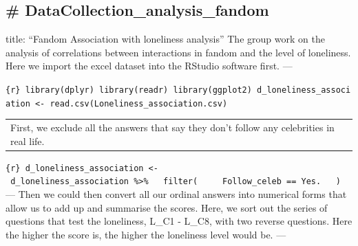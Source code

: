 \documentclass[
]{article}
\author{}
\date{\vspace{-2.5em}}
\begin{document}
\subsection{\#
DataCollection\_analysis\_fandom}\label{datacollection_analysis_fandom}

title: ``Fandom Association with loneliness analysis'' The group work on
the analysis of correlations between interactions in fandom and the
level of loneliness. Here we import the excel dataset into the RStudio
software first. ---

\texttt{\{r\}\ library(dplyr)\ library(readr)\ library(ggplot2)\ d\_loneliness\_association\ \textless{}-\ read.csv(\textquotesingle{}Loneliness\_association.csv\textquotesingle{})}

\begin{longtable}[]{@{}l@{}}
\toprule\noalign{}
\endhead
\bottomrule\noalign{}
\endlastfoot
First, we exclude all the answers that say they don't follow any
celebrities in real life. \\
\end{longtable}

\texttt{\{r\}\ d\_loneliness\_association\ \textless{}-\ d\_loneliness\_association\ \%\textgreater{}\%\ \ \ filter(\ \ \ \ \ Follow\_celeb\ ==\ \textquotesingle{}Yes.\textquotesingle{}\ \ \ )}
--- Then we could then convert all our ordinal answers into numerical
forms that allow us to add up and summarise the scores. Here, we sort
out the series of questions that test the loneliness, L\_C1 - L\_C8,
with two reverse questions. Here the higher the score is, the higher the
loneliness level would be. ---
\end{document}
